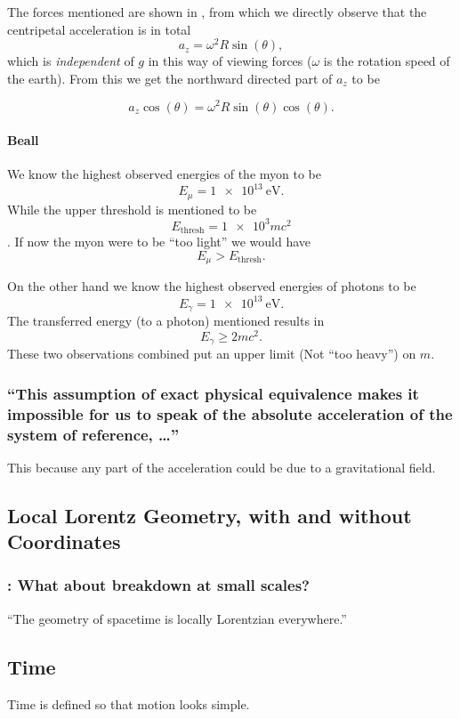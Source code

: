 The forces mentioned are shown in , from which we directly observe that the centripetal acceleration is in total
\[a_z=\omega^2 R \sin(\theta),\]
which is \emph{independent} of $g$ in this way of viewing forces ($\omega$ is the rotation speed of the earth).
From this we get the northward directed part of $a_z$  to be 

\[a_z \cos(\theta)=\omega^2 R \sin(\theta)\cos(\theta).\]

\paragraph{Beall}
We know the highest observed energies of the myon to be \[E_\mu = \SI{1e13}{\electronvolt}.\]
While the upper threshold is mentioned to be \[E_{\text{thresh}}=\num{1e3} m c^2\].
If now the myon were to be \enquote{too light} we would have \[E_\mu>E_{\text{thresh}}.\]

On the other hand we know the highest observed energies of photons to be \[E_\gamma=\SI{1e13}{\electronvolt}.\]
The transferred energy (to a photon) mentioned results in \[E_\gamma\geq 2 m c^2.\] These two observations combined put an upper limit (Not \enquote{too heavy}) on $m$.

\subsubsection{\enquote{This assumption of exact physical equivalence makes it impossible for us to speak of the absolute acceleration of the system of reference, \dots} }
This because any part of the acceleration could be due to a gravitational field.


\subsection{Local Lorentz Geometry, with and without Coordinates}\label{susec:1_4}
\subsubsection{\hint: What about breakdown at small scales? }
\enquote{The geometry of spacetime is locally Lorentzian everywhere.}

\subsection{Time}\label{susec:1_5}
Time is defined so that motion looks simple.

